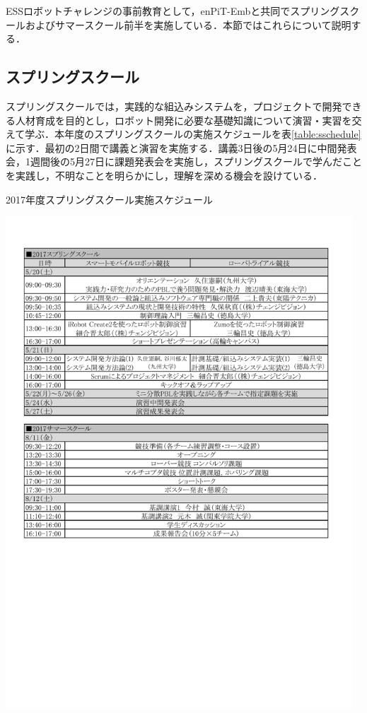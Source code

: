 \documentclass[submit]{ipsj}
\begin{document}
ESSロボットチャレンジの事前教育として，enPiT-Embと共同でスプリングスクールおよびサマースクール前半を実施している．本節ではこれらについて説明する．



\subsection{スプリングスクール}

スプリングスクールでは，実践的な組込みシステムを，プロジェクトで開発できる人材育成を目的とし，ロボット開発に必要な基礎知識について演習・実習を交えて学ぶ．本年度のスプリングスクールの実施スケジュールを表\ref{table:sschedule}に示す．最初の2日間で講義と演習を実施する．講義3日後の5月24日に中間発表会，1週間後の5月27日に課題発表会を実施し，スプリングスクールで学んだことを実践し，不明なことを明らかにし，理解を深める機会を設けている．

\begin{table}[tb]
\caption{2017年度スプリングスクール実施スケジュール}
\label{table:sschedule}
\centering
\includegraphics[width=13cm]{images/springtimetable.pdf}
\end{table}
\end{document}
